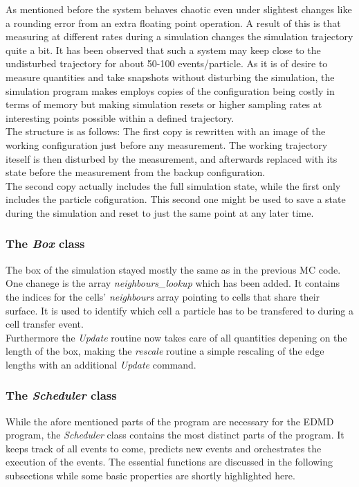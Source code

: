 As mentioned before the system behaves chaotic even under slightest changes like a rounding error from an extra floating point operation. A result of this is that measuring at different rates during a simulation changes the simulation trajectory quite a bit. It has been observed that such a system may keep close to the undisturbed trajectory for about 50-100 events/particle. As it is of desire to measure quantities and take snapshots without disturbing the simulation, the simulation program makes employs copies of the configuration being costly in terms of memory but making simulation resets or higher sampling rates at interesting points possible within a defined trajectory.\\ 

The structure is as follows: The first copy is rewritten with an image of the working configuration just before any measurement. The working trajectory iteself is then disturbed by the measurement, and afterwards replaced with its state before the measurement from the backup configuration.\\
The second copy actually includes the full simulation state, while the first only includes the particle cofiguration. This second one might be used to save a state during the simulation and reset to just the same point at any later time.\\


\subsubsection{The \textit{Box} class}
\label{sec:box_class}
The box of the simulation stayed mostly the same as in the previous MC code. One chanege is the array \textit{neighbours\_lookup} which has been added. It contains the indices for the cells' \textit{neighbours} array pointing to cells that share their surface. It is used to identify which cell a particle has to be transfered to during a cell transfer event.\\

Furthermore the \textit{Update} routine now takes care of all quantities depening on the length of the box, making the \textit{rescale} routine a simple rescaling of the edge lengths with an additional \textit{Update} command.\\

\subsubsection{The \textit{Scheduler} class}
\label{sec:scheduler_class}
While the afore mentioned parts of the program are necessary for the EDMD program, the \textit{Scheduler} class contains the most distinct parts of the program. It keeps track of all events to come, predicts new events and orchestrates the execution of the events. The essential functions are discussed in the following subsections while some basic properties are shortly highlighted here.\\

